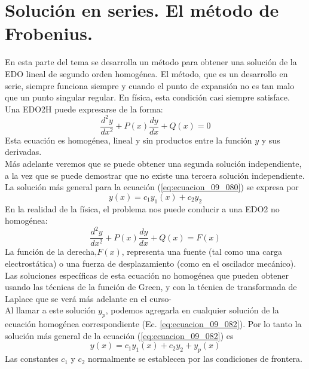 \section{Solución en series. El método de Frobenius.}
En esta parte del tema se desarrolla un método para obtener una solución de la EDO lineal de segundo orden homogénea. El método, que es un desarrollo en serie, siempre funciona siempre y cuando el punto de expansión no es tan malo que un punto singular regular. En física, esta condición casi siempre satisface.
\\
Una EDO2H puede expresarse de la forma:
\begin{equation}
\dfrac{d^{2} y}{d x^{2}} + P(x) \dfrac{dy}{dx} + Q(x) = 0
\label{eq:ecuacion_09_080}
\end{equation}
Esta ecuación es homogénea, lineal y sin productos entre la función $y$ y sus derivadas.
\\
Más adelante veremos que se puede obtener una segunda solución independiente, a la vez que se puede demostrar que no existe una tercera solución independiente.
\\
La solución más general para la ecuación (\ref{eq:ecuacion_09_080}) se expresa por
\begin{equation}
y(x) = c_{1} y_{1}(x) + c_{2} y_{2}
\label{eq:ecuacion_09_081}
\end{equation}
En la realidad de la física, el problema nos puede conducir a una EDO2 no homogénea:
\begin{equation}
\dfrac{d^{2} y}{d x^{2}} + P(x) \dfrac{dy}{dx} + Q(x) = F(x)
\label{eq:ecuacion_09_082}
\end{equation}
La función de la derecha,$F(x)$, representa una fuente (tal como una carga electrostática) o una fuerza de desplazamiento (como en el oscilador mecánico). Las soluciones específicas de esta ecuación no homogénea que pueden obtener usando las  técnicas de la función de Green, y con la técnica de transformada de Laplace que se verá más adelante en el curso-
\\
Al llamar a este solución $y_{p}$, podemos agregarla en cualquier solución de la ecuación homogénea correspondiente (Ec.  \ref{eq:ecuacion_09_082}). Por lo tanto la solución más general de la ecuación (\ref{eq:ecuacion_09_082}) es
\begin{equation}
y(x) = c_{1} y_{1}(x) + c_{2} y_{2} + y_{p} (x)
\label{eq:ecuacion_09_083}
\end{equation}
Las constantes $c_{1}$ y $c_{2}$ normalmente se establecen por las condiciones de frontera.
\\
